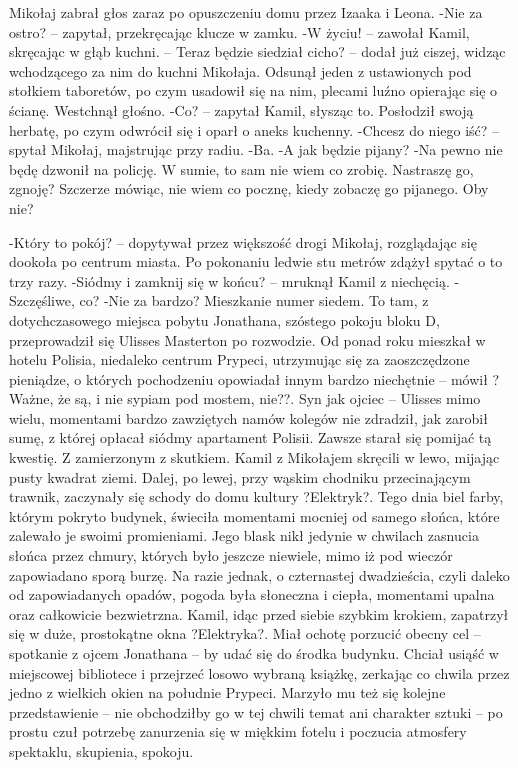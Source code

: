 \documentclass[../MAIN.tex]{subfiles}
\begin{document}
Mikołaj zabrał głos zaraz po opuszczeniu domu przez Izaaka i Leona.
-Nie za ostro? -- zapytał, przekręcając klucze w zamku.
-W życiu! -- zawołał Kamil, skręcając w głąb kuchni. -- Teraz będzie siedział cicho? -- dodał już ciszej, widząc wchodzącego za nim do kuchni Mikołaja. Odsunął jeden z ustawionych pod stołkiem taboretów, po czym usadowił się na nim, plecami luźno opierając się o ścianę. Westchnął głośno.
-Co? -- zapytał Kamil, słysząc to. Posłodził swoją herbatę, po czym odwrócił się i oparł o aneks kuchenny.
-Chcesz do niego iść? -- spytał Mikołaj, majstrując przy radiu.
-Ba.
-A jak będzie pijany?
-Na pewno nie będę dzwonił na policję. W sumie, to sam nie wiem co zrobię. Nastraszę go, zgnoję? Szczerze mówiąc, nie wiem co pocznę, kiedy zobaczę go pijanego. Oby nie?

-Który to pokój? -- dopytywał przez większość drogi Mikołaj, rozglądając się dookoła po centrum miasta. Po pokonaniu ledwie stu metrów zdążył spytać o to trzy razy.
-Siódmy i zamknij się w końcu? -- mruknął Kamil z niechęcią.
-Szczęśliwe, co?
-Nie za bardzo?
Mieszkanie numer siedem.
To tam, z dotychczasowego miejsca pobytu Jonathana, szóstego pokoju bloku D, przeprowadził się Ulisses Masterton po rozwodzie. Od ponad roku mieszkał w hotelu Polisia, niedaleko centrum Prypeci, utrzymując się za zaoszczędzone pieniądze, o których pochodzeniu opowiadał innym bardzo niechętnie -- mówił ?Ważne, że są, i nie sypiam pod mostem, nie??. Syn jak ojciec -- Ulisses mimo wielu, momentami bardzo zawziętych namów kolegów nie zdradził, jak zarobił sumę, z której opłacał siódmy apartament Polisii. Zawsze starał się pomijać tą kwestię. Z zamierzonym z skutkiem.
Kamil z Mikołajem skręcili w lewo, mijając pusty kwadrat ziemi. Dalej, po lewej, przy wąskim chodniku przecinającym trawnik, zaczynały się schody do domu kultury ?Elektryk?. Tego dnia biel farby, którym pokryto budynek, świeciła momentami mocniej od samego słońca, które zalewało je swoimi promieniami. Jego blask nikł jedynie w chwilach zasnucia słońca przez chmury, których było jeszcze niewiele, mimo iż pod wieczór zapowiadano sporą burzę.
Na razie jednak, o czternastej dwadzieścia, czyli daleko od zapowiadanych opadów, pogoda była słoneczna i ciepła, momentami upalna oraz całkowicie bezwietrzna.
Kamil, idąc przed siebie szybkim krokiem, zapatrzył się w duże, prostokątne okna ?Elektryka?. Miał ochotę porzucić obecny cel -- spotkanie z ojcem Jonathana -- by udać się do środka budynku. Chciał usiąść w miejscowej bibliotece i przejrzeć losowo wybraną książkę, zerkając co chwila przez jedno z wielkich okien na południe Prypeci. Marzyło mu też się kolejne przedstawienie -- nie obchodziłby go w tej chwili temat ani charakter sztuki -- po prostu czuł potrzebę zanurzenia się w miękkim fotelu i poczucia atmosfery spektaklu, skupienia, spokoju.
\end{document}
